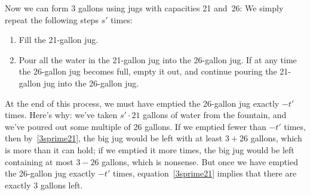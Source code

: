 Now we can form 3 gallons using jugs with capacities 21 and~26: We
simply repeat the following steps $s'$ times:
\begin{enumerate}
\item Fill the 21-gallon jug.
\item Pour all the water in the 21-gallon jug into the 26-gallon jug.
  If at any time the 26-gallon jug becomes full, empty it out, and
  continue pouring the 21-gallon jug into the 26-gallon jug.
\end{enumerate}
At the end of this process, we must have emptied the 26-gallon
jug exactly $-t'$ times.  Here's why: we've taken $s' \cdot 21$
gallons of water from the fountain, and we've poured out some multiple
of 26 gallons.  If we emptied fewer than $-t'$ times, then
by~\eqref{3sprime21}, the big jug would be left with at least $3+26$
gallons, which is more than it can hold; if we emptied it more times,
the big jug would be left containing at most $3-26$ gallons, which is
nonsense.  But once we have emptied the 26-gallon jug exactly $-t'$
times, equation~\eqref{3sprime21} implies that there are exactly 3
gallons left.

